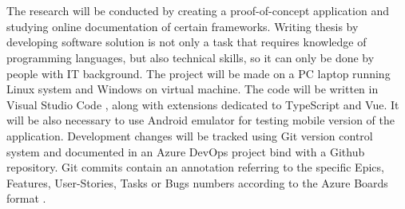 
\chapter{}%
\label{ch:methodologie}







The research will be conducted by creating a proof-of-concept application and studying online documentation of certain frameworks. Writing thesis by developing software solution is not only a task that requires knowledge of programming languages, but also technical skills, so it can only be done by people with IT background. The project will be made on a PC laptop running Linux system and Windows on virtual machine. The code will be written in Visual Studio Code \autocite{Vscode}, along with extensions dedicated to TypeScript and Vue. It will be also necessary to use Android emulator for testing mobile version of the application. Development changes will be tracked using Git version control system and documented in an Azure DevOps project bind with a Github \autocite{Github} repository. 
Git commits contain an annotation referring to the specific Epics, Features, User-Stories, Tasks or Bugs numbers according to the Azure Boards format \autocite{AzureBoards}.

